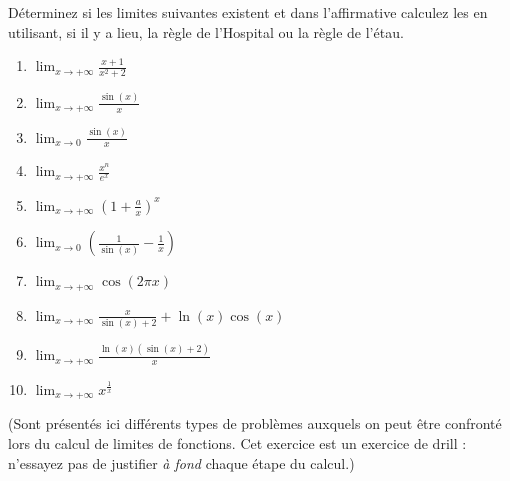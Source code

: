 
\begin{exercice}\label{exo0023}

Déterminez si les limites suivantes existent et dans l'affirmative calculez les en utilisant, si il y a lieu, la règle de l'Hospital ou la règle de l'étau. 
\begin{multicols}{2}
\begin{enumerate}
	\item $ \lim_{x \rightarrow  +\infty} \frac{x+1}{x^2+2}$
	\item $ \lim_{x \rightarrow  +\infty} \frac{\sin(x)}{x} $
	\item $ \lim_{x \rightarrow  0} \frac{\sin(x)}{x} $
	\item $ \lim_{x \rightarrow  +\infty}  \frac{x ^n}{e ^x} $
	\item $ \lim_{x \rightarrow  +\infty} (1 + \frac{a}{x})^x $
	\item $ \lim_{x \rightarrow  0} (\frac{1}{\sin(x)} - \frac{1}{x} )$
	\item $ \lim_{x \rightarrow  +\infty} \cos( 2 \pi x) $
	\item\label{Item0023h} $ \lim_{x \rightarrow  +\infty} \frac{x}{\sin(x)+2} + \ln(x)\cos(x) $
	\item $ \lim_{x \rightarrow  +\infty} \frac{ \ln(x)(\sin(x) + 2)}{x} $
	\item $ \lim_{x \rightarrow  +\infty} x ^\frac{1}{x} $
\end{enumerate}
\end{multicols}
%
(Sont présentés ici différents types de problèmes auxquels on peut être confronté lors du calcul de limites de fonctions. Cet exercice est un exercice de drill : n'essayez pas de justifier \emph{à fond} chaque étape du calcul.)
%

\end{exercice}
